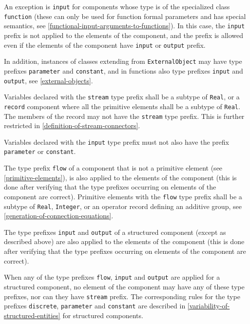 An exception is \lstinline!input! for components whose type is of the specialized class \lstinline!function! (these can only be used for function formal parameters and has special semantics, see \cref{functional-input-arguments-to-functions}).
In this case, the \lstinline!input! prefix is not applied to the elements of the component, and the prefix is allowed even if the elements of the component have \lstinline!input! or \lstinline!output! prefix.

In addition, instances of classes extending from \lstinline!ExternalObject! may have type prefixes \lstinline!parameter! and \lstinline!constant!, and in functions also type prefixes \lstinline!input! and \lstinline!output!, see \cref{external-objects}.

Variables declared with the \lstinline!stream! type prefix shall be a subtype of \lstinline!Real!, or a \lstinline!record! component where all the primitive elements shall be a subtype of \lstinline!Real!.
The members of the record may not have the \lstinline!stream! type prefix.
This is further restricted in \cref{definition-of-stream-connectors}.

Variables declared with the \lstinline!input! type prefix must not also have the prefix \lstinline!parameter! or \lstinline!constant!.

The type prefix \lstinline!flow! of a component that is not a primitive element (see \cref{primitive-elements}), is also applied to the elements of the component (this is done after verifying that the type prefixes occurring on elements of the component are correct).
Primitive elements with the \lstinline!flow! type prefix shall be a subtype of \lstinline!Real!, \lstinline!Integer!, or an operator record defining an additive group, see \cref{generation-of-connection-equations}.

The type prefixes \lstinline!input! and \lstinline!output! of a structured component (except as described above) are also applied to the elements of the component (this is done after verifying that the type prefixes occurring on elements of the component are correct).

When any of the type prefixes \lstinline!flow!, \lstinline!input! and \lstinline!output! are applied for a structured component, no element of the component may have any of these type prefixes, nor can they have \lstinline!stream! prefix.
The corresponding rules for the type prefixes \lstinline!discrete!, \lstinline!parameter! and \lstinline!constant! are described in \cref{variability-of-structured-entities} for structured components.

